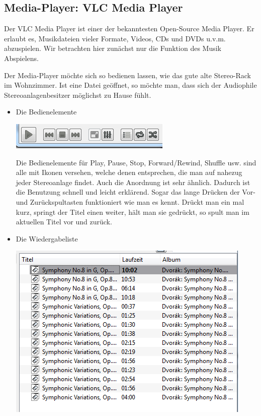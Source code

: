 \documentclass[a4paper,10pt]{article}
\begin{document}
\subsection{Media-Player: VLC Media Player}
Der VLC Media Player ist einer der bekanntesten Open-Source Media Player. Er erlaubt es, Musikdateien vieler Formate, Videos, CDs und DVDs u.v.m. abzuspielen. Wir betrachten hier zunächst nur die Funktion des Musik Abspielens.

Der Media-Player möchte sich so bedienen lassen, wie das gute alte Stereo-Rack im Wohnzimmer. Ist eine Datei geöffnet, so möchte man, dass sich der Audiophile Stereoanlagenbesitzer möglichst zu Hause fühlt.

\begin{itemize}
\item Die Bedienelemente

\includegraphics[scale=1]{knoepfe.png}

Die Bedienelemente für Play, Pause, Stop, Forward/Rewind, Shuffle usw. sind alle mit Ikonen versehen, welche denen entsprechen, die man auf nahezug jeder Stereoanlage findet. Auch die Anordnung ist sehr ähnlich. Dadurch ist die Benutzung schnell und leicht erklärend. Sogar das lange Drücken der Vor- und Zurückspultasten funktioniert wie man es kennt. Drückt man ein mal kurz, springt der Titel einen weiter, hält man sie gedrückt, so spult man im aktuellen Titel vor und zurück.

\item Die Wiedergabeliste

\includegraphics[scale=1]{liste.png}


\end{itemize}
\end{document}
